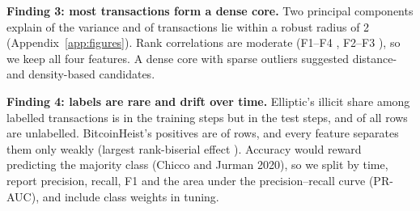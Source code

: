 \textbf{Finding 3: most transactions form a dense core.} Two principal components explain  of
the variance and  of transactions lie within a robust radius of 2 (Appendix~\ref{app:figures}).
Rank correlations are moderate (F1--F4 , F2--F3 ), so we keep all four features. A
dense core with sparse outliers suggested distance- and density-based candidates.

\textbf{Finding 4: labels are rare and drift over time.} Elliptic's illicit share among labelled transactions is
 in the training steps but  in the test steps, and
 of all rows are unlabelled. BitcoinHeist's positives are  of rows, and
every feature separates them only weakly (largest rank-biserial effect ). Accuracy
would reward predicting the majority class (Chicco and Jurman 2020), so we split by time, report precision,
recall, F1 and the area under the precision--recall curve (PR-AUC), and include class weights in tuning.
